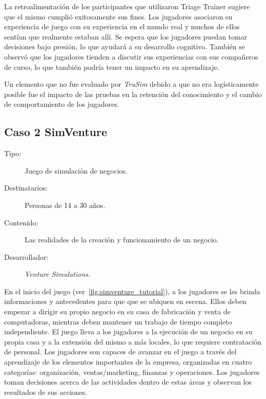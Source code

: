 La retroalimentación de los participantes que utilizaron Triage Trainer sugiere
que el mismo cumplió exitosamente sus fines. Los jugadores asociaron su
experiencia de juego con su experiencia en el mundo real y muchos de ellos
sentían que realmente estaban allí. Se espera que los jugadores puedan tomar
decisiones bajo presión, lo que ayudará a su desarrollo cognitivo. También se
observó que los jugadores tienden a discutir sus experiencias con sus compañeros
de curso, lo que también podría tener un impacto en su aprendizaje.

Un elemento que no fue evaluado por \emph{TruSim} debido a que no era
logísticamente posible fue el impacto de las pruebas en la retención del
conocimiento y el cambio de comportamiento de los
jugadores\cite{education:games}. 


\subsection{Caso 2 SimVenture}

\begin{description}
\item[Tipo:] Juego de simulación de negocios.
\item[Destinatarios:] Personas de 14 a 30 años.
\item[Contenido:] Las realidades de la creación y funcionamiento de un negocio.
\item[Desarrollador:] \emph{Venture Simulations.}
\end{description}

En el inicio del juego (ver~\ref{fig:simventure_tutorial}), a los jugadores se
les brinda informaciones y antecedentes para que que se ubiquen en escena. Ellos
deben empezar a dirigir su propio negocio en su casa de fabricación y venta de
computadoras, mientras deben mantener un trabajo de tiempo completo
independiente. El juego lleva a los jugadores a la ejecución de un negocio en su
propia casa y a la extensión del mismo a más locales, lo que requiere
contratación de personal. Los jugadores son capaces de avanzar en el juego a
través del aprendizaje de los elementos importantes de la empresa, organizadas
en cuatro categorías: organización, ventas/marketing, finanzas y operaciones.
Los jugadores toman decisiones acerca de las actividades dentro de estas áreas y
observan los resultados de sus acciones. 

